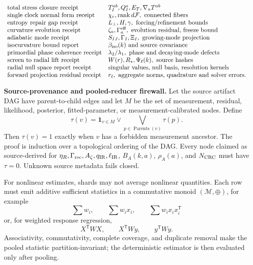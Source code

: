 

\[
\begin{array}{ll}
\mbox{\text{total stress closure receipt}} & T_I^{ab},Q_I^a,E_T,\nabla_aT^{ab} \\
\mbox{\text{single clock normal form receipt}} & \chi_r,\operatorname{rank}d\mathcal F,\hbox{ connected fibers} \\
\mbox{\text{entropy repair gap receipt}} & L_\perp,H,\gamma,\hbox{ forcing/refinement bounds} \\
\mbox{\text{curvature evolution receipt}} & \zeta_a,\Gamma_a^{\rm eff},\hbox{ evolution residual, freeze bound} \\
\mbox{\text{adiabatic mode receipt}} & S_{IJ},\Gamma_I,\Xi_I,\hbox{ growing-mode projection} \\
\mbox{\text{isocurvature bound report}} & \beta_{\rm iso}(k)\hbox{ and source covariance} \\
\mbox{\text{primordial phase coherence receipt}} & \lambda_2/\lambda_1,\hbox{ phase and decaying-mode defects} \\
\mbox{\text{screen to radial lift receipt}} & W(r),R_\star,\Psi_\ell(k),\hbox{ source hashes} \\
\mbox{\text{radial null space report receipt}} & \hbox{singular values, null basis, resolution kernels} \\
\mbox{\text{forward projection residual receipt}} & r_\ell,\hbox{ aggregate norms, quadrature and solver errors}.
\end{array}
\]

\textbf{Source-provenance and pooled-reducer firewall.}\label{par:source-provenance-firewall}
Let the source artifact DAG have parent-to-child edges and let \(M\) be the set
of measurement, residual, likelihood, posterior, fitted-parameter, or
measurement-calibrated nodes.  Define
\[
\tau(v)=\mathbf 1_{v\in M}\lor
\bigvee_{p\in\operatorname{Parents}(v)}\tau(p).
\]
Then \(\tau(v)=1\) exactly when \(v\) has a forbidden measurement ancestor.  The
proof is induction over a topological ordering of the DAG. Every node claimed
as source-derived for \(\eta_R,\Gamma_{\rm rec},A_\zeta,q_{\rm IR},\ell_{\rm IR}\),
\(B_A(k,a)\), \(\rho_A(a)\), and \(N_{\rm CRC}\) must have \(\tau=0\).
Unknown source metadata fails closed.

For nonlinear estimates, shards may not average nonlinear quantities.
Each row must emit additive sufficient statistics in a commutative monoid
\((\mathcal M,\oplus)\), for example
\[
\sum w_i,\qquad \sum w_ix_i,\qquad \sum w_ix_ix_i^{\mathsf T}
\]
or, for weighted response regression,
\[
X^{\mathsf T}WX,\qquad X^{\mathsf T}Wy,\qquad y^{\mathsf T}Wy .
\]
Associativity, commutativity, complete coverage, and duplicate removal make the
pooled statistic partition-invariant; the deterministic estimator is then
evaluated only after pooling.

